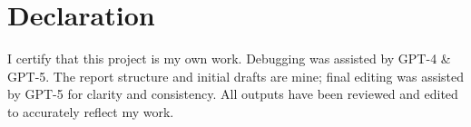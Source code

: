 
\chapter*{Declaration}

I certify that this project is my own work. Debugging was assisted by GPT-4 \& GPT-5. The report structure and initial drafts are mine; final editing was assisted by GPT-5 for clarity and consistency. All outputs have been reviewed and edited to accurately reflect my work.